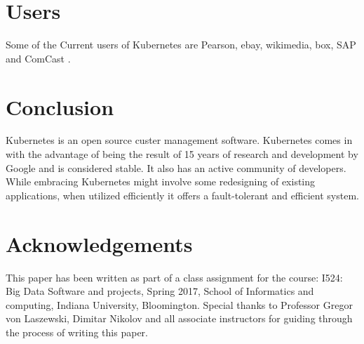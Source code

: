 \documentclass[9pt,twocolumn,twoside]{../../styles/osajnl}
\begin{document}
\section{Users}
Some of the Current users of Kubernetes are Pearson, ebay, wikimedia, box, SAP and ComCast \cite{www-kubernetesusers}.
\section{Conclusion}
Kubernetes is an open source custer management software. Kubernetes comes in with the advantage of being the result of 15 years of research and development by Google and is considered stable. It also has an active community of developers. While embracing Kubernetes might involve some redesigning of existing applications, when utilized efficiently it offers a fault-tolerant and efficient system.



\section*{Acknowledgements}

This paper has been written as part of a class assignment for the course: 
I524: Big Data Software and projects, Spring 2017, School of Informatics and computing, Indiana University, Bloomington.
Special thanks to Professor Gregor von Laszewski, Dimitar Nikolov and all associate instructors for guiding through the process of writing this paper.




 
\end{document}
